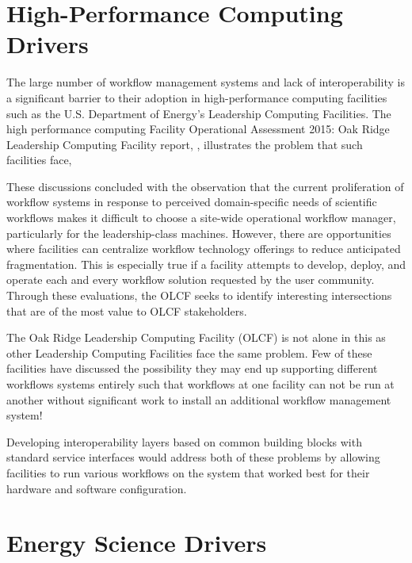 \section{High-Performance Computing
Drivers}\label{high-performance-computing-drivers}

The large number of workflow management systems and lack of
interoperability is a significant barrier to their adoption in
high-performance computing facilities such as the U.S. Department of Energy's
Leadership Computing Facilities. The high performance computing Facility
Operational Assessment 2015: Oak Ridge Leadership Computing Facility
report, \cite{barker_scientific_2007}, illustrates the problem that such facilities
face,

\begin{displayquote}
These discussions concluded with the observation that the current proliferation
of workflow systems in response to perceived domain-specific needs of 
scientific workflows makes it difficult to choose a site-wide operational
workflow manager, particularly for the leadership-class machines. However,
there are opportunities where facilities can centralize workflow technology 
offerings to reduce anticipated fragmentation. This is especially true if a 
facility attempts to develop, deploy, and operate each and every workflow 
solution requested by the user community. Through these evaluations, the OLCF
seeks to identify interesting intersections that are of the most value to OLCF
stakeholders.
\end{displayquote}

The Oak Ridge Leadership Computing Facility (OLCF) is not alone in this
as other Leadership Computing Facilities face the same problem. Few
of these facilities have discussed the possibility they may end up
supporting different workflows systems entirely such that workflows at
one facility can not be run at another without significant work to
install an additional workflow management system!

Developing interoperability layers based on common building blocks with
standard service interfaces would address both of these problems by
allowing facilities to run various workflows on the system that worked
best for their hardware and software configuration.

\section{Energy Science Drivers}\label{energy-science-drivers}

